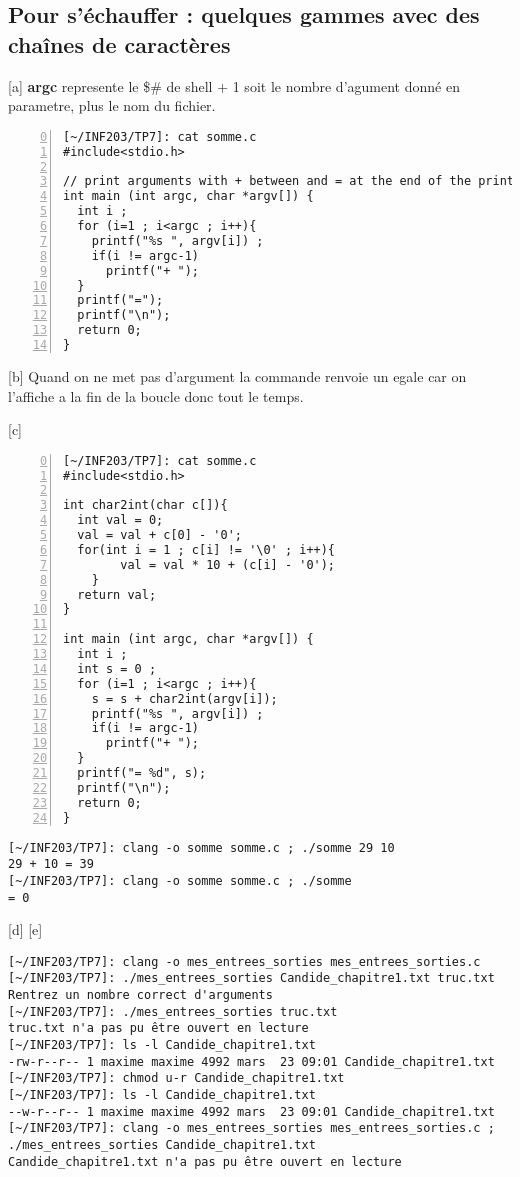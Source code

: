 \documentclass[12pt,a4paper,notitlepage,colorinlistoftodos]{article}
\begin{document}

\subsection*{Pour s'échauffer : quelques gammes avec des chaînes de caractères}


[a] 
\textbf{argc} represente le \$\# de shell + 1 soit le nombre d'agument donné en parametre, plus le nom du fichier.

\begin{lstlisting}[numbers=left, firstnumber = 0 ]
[~/INF203/TP7]: cat somme.c
#include<stdio.h>

// print arguments with + between and = at the end of the printf
int main (int argc, char *argv[]) {
  int i ;
  for (i=1 ; i<argc ; i++){
    printf("%s ", argv[i]) ;
    if(i != argc-1)
      printf("+ ");
  }
  printf("=");
  printf("\n");
  return 0;
}
\end{lstlisting}


[b]
Quand on ne met pas d'argument la commande renvoie un egale car on l'affiche a la fin de la boucle donc tout le temps.

[c]
\begin{lstlisting}[numbers=left, firstnumber = 0 ]
[~/INF203/TP7]: cat somme.c
#include<stdio.h>

int char2int(char c[]){
  int val = 0;
  val = val + c[0] - '0';
  for(int i = 1 ; c[i] != '\0' ; i++){
        val = val * 10 + (c[i] - '0');
    }
  return val;
}

int main (int argc, char *argv[]) {
  int i ;
  int s = 0 ;
  for (i=1 ; i<argc ; i++){
    s = s + char2int(argv[i]);
    printf("%s ", argv[i]) ;
    if(i != argc-1)
      printf("+ ");
  }
  printf("= %d", s);
  printf("\n");
  return 0;
}
\end{lstlisting}

\begin{lstlisting}
[~/INF203/TP7]: clang -o somme somme.c ; ./somme 29 10
29 + 10 = 39
[~/INF203/TP7]: clang -o somme somme.c ; ./somme 
= 0
\end{lstlisting}


[d] [e]
\begin{lstlisting}
[~/INF203/TP7]: clang -o mes_entrees_sorties mes_entrees_sorties.c
[~/INF203/TP7]: ./mes_entrees_sorties Candide_chapitre1.txt truc.txt
Rentrez un nombre correct d'arguments
[~/INF203/TP7]: ./mes_entrees_sorties truc.txt
truc.txt n'a pas pu être ouvert en lecture
[~/INF203/TP7]: ls -l Candide_chapitre1.txt 
-rw-r--r-- 1 maxime maxime 4992 mars  23 09:01 Candide_chapitre1.txt
[~/INF203/TP7]: chmod u-r Candide_chapitre1.txt 
[~/INF203/TP7]: ls -l Candide_chapitre1.txt 
--w-r--r-- 1 maxime maxime 4992 mars  23 09:01 Candide_chapitre1.txt
[~/INF203/TP7]: clang -o mes_entrees_sorties mes_entrees_sorties.c ; ./mes_entrees_sorties Candide_chapitre1.txt 
Candide_chapitre1.txt n'a pas pu être ouvert en lecture
\end{lstlisting}
\end{document}
